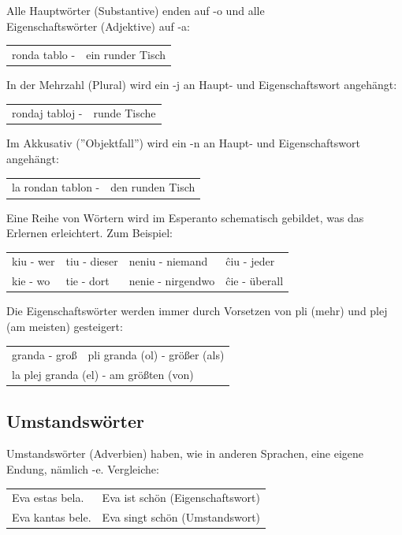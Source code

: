 \documentclass{leaflet}
\begin{document}
Alle Hauptwörter (Substantive) enden auf -o und alle \\ Eigenschaftswörter (Adjektive) auf -a:

\begin{tabular}{ll}
ronda tablo -& ein runder Tisch
\end{tabular}

In der Mehrzahl (Plural) wird ein -j an Haupt- und Eigenschaftswort angehängt:

\begin{tabular}{ll}
rondaj tabloj -& runde Tische
\end{tabular}

Im Akkusativ (''Objektfall'') wird ein -n an Haupt- und Eigenschaftswort angehängt:

\begin{tabular}{ll}
	la rondan tablon -& den runden Tisch
\end{tabular}

Eine Reihe von Wörtern wird im Esperanto schematisch gebildet, was das Erlernen erleichtert. Zum Beispiel:

\begin{tabular}{llll}
	kiu - wer   &tiu - dieser   &neniu - niemand  &ĉiu - jeder\\
	kie - wo    &tie - dort     &nenie - nirgendwo&ĉie - überall
\end{tabular}

Die Eigenschaftswörter werden immer durch Vorsetzen von pli (mehr) und plej (am meisten) gesteigert:

\begin{tabular}{ll}
granda - groß  & pli granda (ol) - größer (als)  \\ \multicolumn{2}{l}{la plej granda (el) - am größten (von)}
\end{tabular}

\vspace{-.3cm}

\subsection{Umstandswörter}

\vspace{-.1cm}

Umstandswörter (Adverbien) haben, wie in anderen Sprachen, eine eigene Endung, nämlich -e.
Vergleiche:

\begin{tabular}{ll}
Eva estas bela. & Eva ist schön (Eigenschaftswort)\\
Eva kantas bele. & Eva singt schön (Umstandswort)
\end{tabular}
\end{document}

